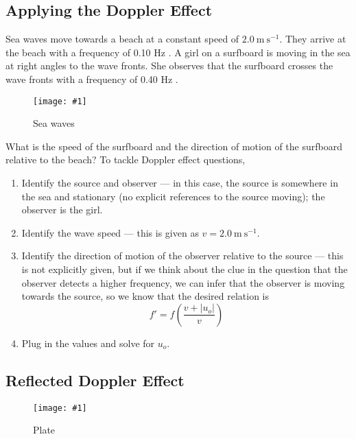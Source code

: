 \documentclass[a4paper,12pt]{article}
\newcommand{\img}[4]{\begin{center}
  \begin{figure}[H]
    \centering
    \texttt{[image: \#1]}
    \caption{#3}
    \label{fig:#4}
  \end{figure}
\end{center}}
\newcommand{\paren}[1]{\left(#1\right)}
\begin{document}
\pagebreak

\subsection{Applying the Doppler Effect}

Sea waves move towards a beach at a constant speed of $2.0 \mathrm{~m} \mathrm{~s}^{-1}$. They arrive at the beach with a frequency of 0.10 Hz . A girl on a surfboard is moving in the sea at right angles to the wave fronts. She observes that the surfboard crosses the wave fronts with a frequency of 0.40 Hz .
\img{ex/sea.png}{0.5}{Sea waves}{sea}
What is the speed of the surfboard and the direction of motion of the surfboard relative to the beach? To tackle Doppler effect questions,
\begin{enumerate}
  \item Identify the source and observer --- in this case, the source is somewhere in the sea and stationary (no explicit references to the source moving); the observer is the girl.
  \item Identify the wave speed --- this is given as $v = 2.0 \mathrm{~m} \mathrm{~s}^{-1}$.
  \item Identify the direction of motion of the observer relative to the source --- this is not explicitly given, but if we think about the clue in the question that the observer detects a higher frequency, we can infer that the observer is moving towards the source, so we know that the desired relation is
        $$f' = f\paren{\frac{v + |u_o|}{v}}$$
  \item Plug in the values and solve for $u_o$.
\end{enumerate}

\subsection{Reflected Doppler Effect}

\img{ex/plate.png}{0.5}{Plate}{plate}
\end{document}
